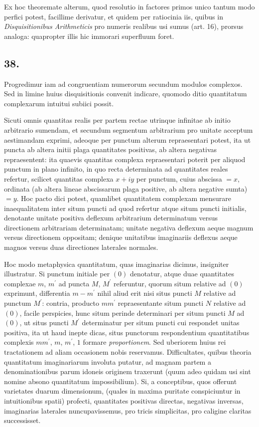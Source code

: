 \documentclass[twoside,12pt, showframe]{memoir}
\begin{document}
Ex hoc theoremate alterum, quod resolutio in factores primos unico tantum modo perfici potest, facillime derivatur, et quidem per ratiocinia iis, quibus in \textit{Disquisitionibus Arithmeticis} pro numeris realibus usi sumus (art. 16), prorsus analoga: quapropter illis hic immorari superfluum foret.

\subsection*{38.}
 
Progredimur iam ad congruentiam numerorum secundum modulos complexos. Sed in limine huius disquisitionis convenit indicare, quomodo ditio quantitatum complexarum intuitui subiici possit.
 
Sicuti omnis quantitas realis per partem rectae utrinque infinitae ab initio arbitrario sumendam, et secundum segmentum arbitrarium pro unitate acceptum aestimandam exprimi, adeoque per punctum alterum repraesentari potest, ita ut puncta ab altera initii plaga quantitates positivas, ab altera negativas repraesentent: ita quaevis quantitas complexa repraesentari poterit per aliquod punctum in plano infinito, in quo recta determinata ad quantitates reales refertur, scilicet quantitas complexa \(x+i y\) per punctum, cuius abscissa \(=x\), ordinata (ab altera lineae abscissarum plaga positive, ab altera negative sumta) \(=y\). Hoc pacto dici potest, quamlibet quantitatem complexam mensurare inaequalitatem inter situm puncti ad quod refertur atque situm puncti initialis, denotante unitate positiva deflexum arbitrarium determinatum versus directionem arbitrariam determinatam; unitate negativa deflexum aeque magnum versus directionem oppositam; denique unitatibus imaginariis deflexus aeque magnos versus duas directiones laterales normales.

Hoc modo metaphysica quantitatum, quas imaginarias dicimus, insigniter illustratur. Si punctum initiale per \((0)\) denotatur, atque duae quantitates complexae \(m\), \(m^{\prime}\) ad puncta \(M\), \(M^{\prime}\) referuntur, quorum situm relative ad \((0)\) exprimunt, differentia \(m-m^{\prime}\) nihil aliud erit nisi situs puncti \(M\) relative ad punctum \(M^{\prime}\): contria, producto \(m m^{\prime}\) repraesentante situm puncti \(N\) relative ad \((0)\), facile perspicies, hunc situm perinde determinari per situm puncti \(M\) ad \((0)\), ut situs puncti \(M^{\prime}\) determinatur per situm puncti cui respondet unitas positiva, ita ut haud inepte dicas, situs punctorum respondentium quantitatibus complexis \(m m^{\prime}\),\clearpage\noindent%
\(m\), \(m^{\prime}\), \(1\) formare \textit{proportionem}. Sed uberiorem huius rei tractationem ad aliam occasionem nobis reservamus. Difficultates, quibus theoria quantitatum imaginariarum involuta putatur, ad magnam partem a denominationibus parum idoneis originem traxerunt (quum adeo quidam usi sint nomine absono quantitatum impossibilium). Si, a conceptibus, quos offerunt varietates duarum dimensionum, (quales in maxima puritate conspiciuntur in intuitionibus spatii) profecti, quantitates positivas directas, negativas inversas, imaginarias laterales nuncupavissemus, pro tricis simplicitas, pro caligine claritas successisset.
\end{document}
